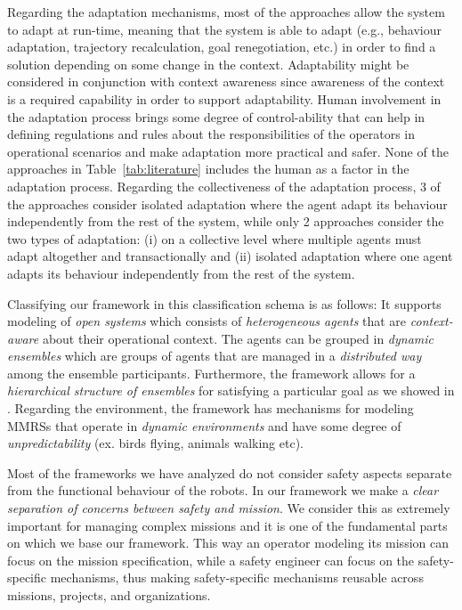 \documentclass[journal]{IEEEtran}
\theoremstyle{definition}
\begin{document}
Regarding the adaptation mechanisms, most of the approaches allow the system to adapt at run-time, meaning that the system is able to adapt (e.g., behaviour adaptation, trajectory recalculation, goal renegotiation, etc.) in order to find a solution depending on some change in the context. Adaptability might be considered in conjunction with context awareness since awareness of the context is a required capability in order to support adaptability. Human involvement in the adaptation process brings some degree of control-ability that can help in defining regulations and rules about the responsibilities of the operators in operational scenarios and make adaptation more practical and safer. None of the approaches in Table~\ref{tab:literature} includes the human as a factor in the adaptation process.
Regarding the collectiveness of the adaptation process, 3 of the approaches consider isolated adaptation where the agent adapt its behaviour independently from the rest of the system, while only 2 approaches consider the two types of adaptation: (i) on a collective level where multiple agents must adapt altogether and transactionally
and (ii) isolated adaptation where one agent adapts its behaviour independently from the rest of the system. 


Classifying our framework in this classification schema is as follows:
It supports modeling of
  \textit{open systems} which consists of \textit{heterogeneous agents} that are \textit{context-aware} about their operational context. The agents can be grouped in \textit{dynamic ensembles} which are groups of agents that are managed in a \textit{distributed way} among the ensemble participants. Furthermore, the framework allows for a \textit{hierarchical structure of ensembles} for satisfying a particular goal as we showed in \cite{bozhinoski2016leveraging}.
Regarding the environment, the framework has mechanisms for modeling MMRSs that operate in \textit{dynamic environments} and have some degree of \textit{unpredictability} (ex. birds flying, animals walking etc).

Most of the frameworks we have analyzed do not consider safety aspects separate from the functional behaviour of the robots. In our framework we make a \textit{clear separation of concerns between safety and mission}. We consider this as extremely important for managing complex missions and it is one of the fundamental parts on which we base our framework. This way an operator modeling its mission can focus on the mission specification, while a safety engineer can focus on the safety-specific mechanisms, thus making safety-specific mechanisms reusable across missions, projects, and organizations.
\end{document}
